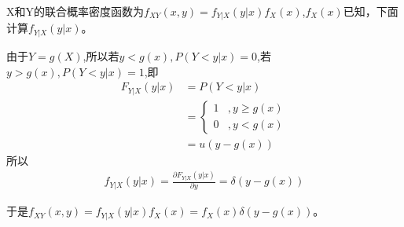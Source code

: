 \documentclass[fontset=windows]{article}
\numberwithin{figure}{section}
\begin{document}
X和Y的联合概率密度函数为\(f_{XY}(x,y)=f_{Y|X}(y|x)f_X(x)\),\(f_X(x)\)已知，下面计算\(f_{Y|X}(y|x)\)。

由于\(Y=g(X)\),所以若\(y<g(x),P(Y<y|x)=0\),若\(y>g(x),P(Y<y|x)=1\),即
\begin{align*}
    F_{Y|X}(y|x) & =P(Y<y|x)  \\
                 & =\left\{
    \begin{matrix}
        1 & ,y\geq  g(x) \\
        0 & ,y< g(x)
    \end{matrix}
    \right.                   \\
                 & =u(y-g(x))
\end{align*}
所以
\begin{align*}
    f_{Y|X}(y|x)=\frac{\partial F_{Y|X}(y|x)}{\partial y}=\delta(y-g(x))
\end{align*}

于是\(f_{XY}(x,y)=f_{Y|X}(y|x)f_X(x)=f_X(x)\delta(y-g(x))\)。


\end{document}
